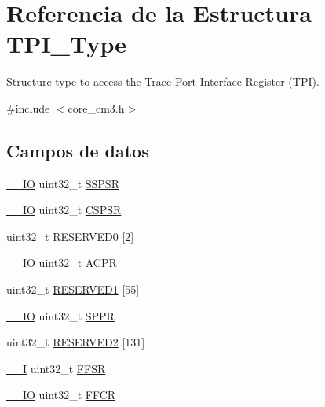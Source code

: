 \hypertarget{struct_t_p_i___type}{}\section{Referencia de la Estructura T\+P\+I\+\_\+\+Type}
\label{struct_t_p_i___type}


Structure type to access the Trace Port Interface Register (T\+PI).  




{\ttfamily \#include $<$core\+\_\+cm3.\+h$>$}

\subsection*{Campos de datos}
\begin{DoxyCompactItemize}
\item 
\hyperlink{core__sc300_8h_aec43007d9998a0a0e01faede4133d6be}{\+\_\+\+\_\+\+IO} uint32\+\_\+t \hyperlink{struct_t_p_i___type_ad6abd8c7878d64e5e8e442de842f9de8}{S\+S\+P\+SR}
\item 
\hyperlink{core__sc300_8h_aec43007d9998a0a0e01faede4133d6be}{\+\_\+\+\_\+\+IO} uint32\+\_\+t \hyperlink{struct_t_p_i___type_a473c1ca66cec890b536d9c9a13a2d8c2}{C\+S\+P\+SR}
\item 
uint32\+\_\+t \hyperlink{struct_t_p_i___type_af2c92c7cb13569aaff6b4f5a25de5056}{R\+E\+S\+E\+R\+V\+E\+D0} \mbox{[}2\mbox{]}
\item 
\hyperlink{core__sc300_8h_aec43007d9998a0a0e01faede4133d6be}{\+\_\+\+\_\+\+IO} uint32\+\_\+t \hyperlink{struct_t_p_i___type_a4bdbe4ff58983d940ca72d8733feaedd}{A\+C\+PR}
\item 
uint32\+\_\+t \hyperlink{struct_t_p_i___type_ab90aea487bf1662e59617af05b30f253}{R\+E\+S\+E\+R\+V\+E\+D1} \mbox{[}55\mbox{]}
\item 
\hyperlink{core__sc300_8h_aec43007d9998a0a0e01faede4133d6be}{\+\_\+\+\_\+\+IO} uint32\+\_\+t \hyperlink{struct_t_p_i___type_a102814b254904beb9060757a93fe526c}{S\+P\+PR}
\item 
uint32\+\_\+t \hyperlink{struct_t_p_i___type_a4e4e19be116d8ccdcb242401cfb3048b}{R\+E\+S\+E\+R\+V\+E\+D2} \mbox{[}131\mbox{]}
\item 
\hyperlink{core__sc300_8h_af63697ed9952cc71e1225efe205f6cd3}{\+\_\+\+\_\+I} uint32\+\_\+t \hyperlink{struct_t_p_i___type_ab1bcdedfb12eaebecde53a7add7f9f84}{F\+F\+SR}
\item 
\hyperlink{core__sc300_8h_aec43007d9998a0a0e01faede4133d6be}{\+\_\+\+\_\+\+IO} uint32\+\_\+t \hyperlink{struct_t_p_i___type_a511d496d51cf81ccef6e97fd1d5abe31}{F\+F\+CR}

\end{DoxyCompactItemize}
